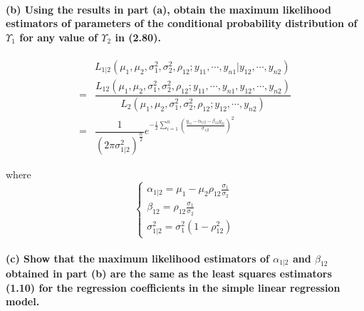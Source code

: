 \documentclass[]{article}
\let\oldparagraph\paragraph
\renewcommand{\paragraph}[1]{\oldparagraph{#1}\mbox{}}
\begin{document}
\paragraph{\texorpdfstring{(b) Using the results in part (a), obtain the
maximum likelihood estimators of parameters of the conditional
probability distribution of \(Υ_1\) for any value of \(Υ_2\) in
(2.80).}{(b) Using the results in part (a), obtain the maximum likelihood estimators of parameters of the conditional probability distribution of Υ\_1 for any value of Υ\_2 in (2.80).}}\label{b-using-the-results-in-part-a-obtain-the-maximum-likelihood-estimators-of-parameters-of-the-conditional-probability-distribution-of-_1-for-any-value-of-_2-in-2.80.}

\begin{align*}
&L_{1|2}(\mu_1,\mu_2,\sigma_1^2,\sigma_2^2,\rho_{12};y_{11},\cdots,y_{n1}|y_{12},\cdots,y_{n2})\\
=&\dfrac{L_{12}(\mu_1,\mu_2,\sigma_1^2,\sigma_2^2,\rho_{12};y_{11},\cdots,y_{n1},y_{12},\cdots,y_{n2})}{L_2(\mu_1,\mu_2,\sigma_1^2,\sigma_2^2,\rho_{12};y_{12},\cdots,y_{n2})}\\
=&\dfrac{1}{(2\pi\sigma^2_{1|2})^{\frac{n}{2}}}e^{-\frac{1}{2}\sum\limits_{i=1}^n\left(\frac{y_{i1}-\alpha_{1|2}-\beta_{12}y_{i2}}{\sigma_{1|2}}\right)^2}
\end{align*}

where \[\begin{cases}
\alpha_{1|2}=\mu_1-\mu_2\rho_{12}\frac{\sigma_1}{\sigma_2}\\
\beta_{12}=\rho_{12}\frac{\sigma_1}{\sigma_2}\\
\sigma^2_{1|2}=\sigma_1^2(1-\rho_{12}^2)
\end{cases}\]

\paragraph{\texorpdfstring{(c) Show that the maximum likelihood
estimators of \(\alpha_{1|2}\) and \(\beta_{12}\) obtained in part (b)
are the same as the least squares estimators (1.10) for the regression
coefficients in the simple linear regression
model.}{(c) Show that the maximum likelihood estimators of \textbackslash{}alpha\_\{1\textbar{}2\} and \textbackslash{}beta\_\{12\} obtained in part (b) are the same as the least squares estimators (1.10) for the regression coefficients in the simple linear regression model.}}\label{c-show-that-the-maximum-likelihood-estimators-of-alpha_12-and-beta_12-obtained-in-part-b-are-the-same-as-the-least-squares-estimators-1.10-for-the-regression-coefficients-in-the-simple-linear-regression-model.}
\end{document}
